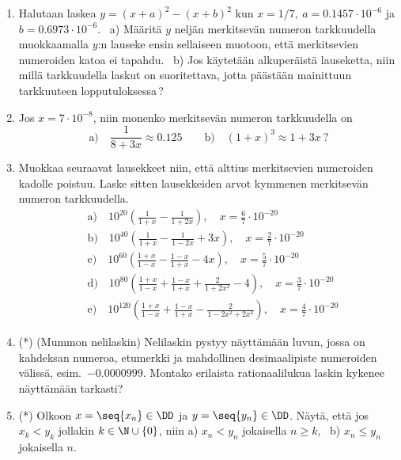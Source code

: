 \begin{enumerate}
\item
Halutaan laskea $y=(x+a)^2-(x+b)^2$ kun $x=1/7,\ a=0.1457 \cdot 10^{-6}$ ja 
$b=0.6973 \cdot 10^{-6}$. \ a) Määritä $y$ neljän merkitsevän numeron tarkkuudella muokkaamalla
$y$:n lauseke ensin sellaiseen muotoon, että merkitsevien numeroiden katoa ei tapahdu. \ b) Jos
käytetään alkuperäistä lauseketta, niin millä tarkkuudella laskut on suoritettava, jotta
päästään mainittuun tarkkuuteen lopputuloksessa\,?

\item
Jos $x=7 \cdot 10^{-8}$, niin monenko merkitsevän numeron tarkkuudella on
\[
\text{a)} \quad \frac{1}{8+3x} \approx 0.125 \qquad \text{b)} \quad (1+x)^3 \approx 1+3x\ ?
\]

\item
Muokkaa seuraavat lausekkeet niin, että alttius merkitsevien numeroiden kadolle poistuu. Laske
sitten lausekkeiden arvot kymmenen merkitsevän numeron tarkkuudella.
\begin{align*}
&\text{a)} \quad 10^{20}\left(\frac{1}{1+x}-\frac{1}{1+2x}\right), \quad 
                                                 x = \frac{6}{7} \cdot 10^{-20} \\
&\text{b)} \quad 10^{40}\left(\frac{1}{1+x}-\frac{1}{1-2x}+3x\right), \quad 
                                                 x = \frac{2}{7} \cdot 10^{-20} \\
&\text{c)} \quad 10^{60}\left(\frac{1+x}{1-x}-\frac{1-x}{1+x}-4x\right), \quad
                                                 x = \frac{5}{7} \cdot 10^{-20} \\
&\text{d)} \quad 10^{80}\left(\frac{1+x}{1-x}+\frac{1-x}{1+x}+\frac{2}{1+2x^2}-4\right), \quad
                                                 x = \frac{3}{7} \cdot 10^{-20} \\
&\text{e)} \quad 10^{120}\left(\frac{1+x}{1-x}+\frac{1-x}{1+x}
                                              -\frac{2}{1-2x^2+2x^4}\right), \quad
                                                 x = \frac{4}{7} \cdot 10^{-20}
\end{align*}

\item (*)  
(Mummon nelilaskin) Nelilaskin pystyy näyttämään luvun, jossa on kahdeksan numeroa, etumerkki
ja mahdollinen desimaalipiste numeroiden välissä, esim.\ $-0.0000999$. Montako erilaista
rationaalilukua laskin kykenee näyttämään tarkasti?

\item (*) \label{H-I-4.8}
Olkoon $x=\seq{x_n}\in\DD$ ja $y=\seq{y_n}\in\DD$. Näytä, että jos $x_k < y_k$ jollakin
$k\in\N\cup\{0\}$, niin a) $x_n < y_n$ jokaisella $n \ge k$, \ b) $x_n \le y_n$ jokaisella $n$.


\end{enumerate}
